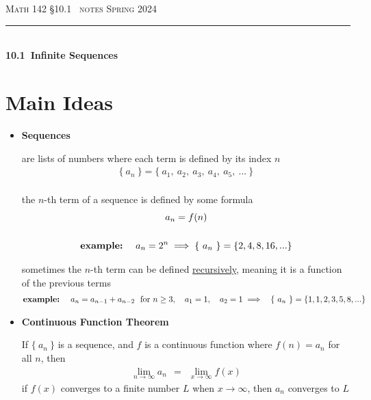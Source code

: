 \documentclass{article}
\begin{document}
\def\chapt{10.1}
\def\chaptname{Infinite Sequences}

\noindent
{\scshape Math 142} \hfill {\scshape \S\chapt~ notes} \hfill {\scshape Spring 2024}

\smallskip

\hrule

\bigskip

\hfill
\\

{
\huge
\noindent
\textbf{\chapt~\chaptname}
}

\thispagestyle{empty}

\section*{Main Ideas}

\begin{itemize}

\item
\textbf{Sequences}

are lists of numbers where each term is defined by its index $n$
\begin{gather*}
\{~a_n~\} = \{~ a_1,~ a_2,~ a_3,~ a_4,~ a_5,~... ~\}
\\
\end{gather*}

the $n$-th term of a sequence is defined by some formula
\begin{gather*}
a_n=f(n)
\\
\\
\text{\textbf{example:}}~~~~a_n=2^n
\implies \{~a_n~\}=\{2,4,8,16,...\}
\end{gather*}

sometimes the $n$-th term can be defined \underline{recursively},
meaning it is a function of the previous terms
\begin{gather*}
\text{\textbf{example:}}~~~~a_n =a_{n-1} + a_{n-2}~ \text{ for } n \geq 3,
~~~a_1=1,~~~ a_2=1
\implies
~~\{~a_n~\}=\{1,1,2,3,5,8,...\}
\end{gather*}

\item
\textbf{Continuous Function Theorem}

If $\{~ a_n ~\}$ is a sequence, and $f$ is a continuous function where $f(n)=a_n$
for all $n$, then
\begin{gather*}
\lim_{n \to \infty} a_n
~~=~~
\lim_{x \to \infty} f(x)
\end{gather*}
if $f(x)$ converges to a finite number $L$ when $x \to \infty$, then $a_n$ converges to $L$
\hfill
\\


\end{itemize}
\end{document}
